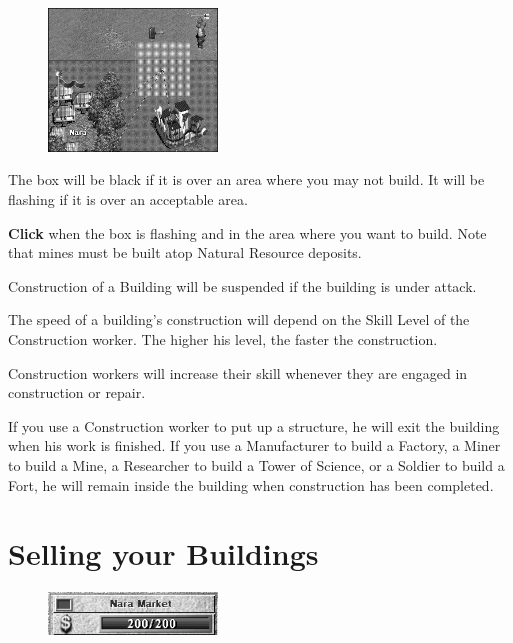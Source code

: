 \begin{figure}
	\vspace{-20pt}
	\begin{center}
		\includegraphics[width=0.4\textwidth]{Ibuildbox}
	\end{center}
	\vspace{-20pt}
\end{figure}

The box will be black if it is over an area where you may not build. It will be flashing if it is over an acceptable area.

\textbf{Click} when the box is flashing and in the area where you want to build. Note that mines must be built atop Natural Resource deposits. 


Construction of a Building will be suspended if the building is under attack.

The speed of a building’s construction will depend on the Skill Level of the Construction worker. The higher his level, the faster the construction.

Construction workers will increase their skill whenever they are engaged in construction or repair.

If you use a Construction worker to put up a structure, he will exit the building when his work is finished. If you use a Manufacturer to build a Factory, a Miner to build a Mine, a Researcher to build a Tower of Science, or a Soldier to build a Fort, he will remain inside the building when construction has been completed.

\section{Selling your Buildings}


\begin{figure}
	\vspace{-20pt}
	\begin{center}
		\includegraphics[width=0.4\textwidth]{Ifullheath_building}
	\end{center}
	\vspace{-20pt}
\end{figure}

